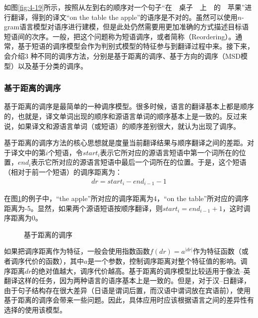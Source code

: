 \parinterval 如图\ref{fig:4-19}所示，按照从左到右的顺序对一个句子``在\ \ 桌子\ \ 上\ \ 的\ \ 苹果''进行翻译，得到的译文``on the table the apple''的语序是不对的。虽然可以使用$n$-gram语言模型对语序进行建模，但是此处仍然需要用更加准确的方式描述目标语短语间的次序。一般，把这个问题称为短语调序，或者简称{\small{}}（Reordering）。通常，基于短语的调序模型会作为判别式模型的特征参与到翻译过程中来。接下来，会介绍3 种不同的调序方法，分别是基于距离的调序、基于方向的调序（MSD模型）以及基于分类的调序。


\subsubsection{基于距离的调序}

\parinterval 基于距离的调序是最简单的一种调序模型。很多时候，语言的翻译基本上都是顺序的，也就是，译文单词出现的顺序和源语言单词的顺序基本上是一致的。反过来说，如果译文和源语言单词（或短语）的顺序差别很大，就认为出现了调序。

\parinterval 基于距离的调序方法的核心思想就是度量当前翻译结果与顺序翻译之间的差距。对于译文中的第$i$个短语，令$start_i$表示它所对应的源语言短语中第一个词所在的位置，$end_i$表示它所对应的源语言短语中最后一个词所在的位置。于是，这个短语（相对于前一个短语）的调序距离为：
\begin{eqnarray}
dr = start_i-end_{i-1}-1
\label{eq:4-15}
\end{eqnarray}

\parinterval 在图\ref{fig:4-20}的例子中，``the apple''所对应的调序距离为4，``on the table''所对应的调序距离为-5。显然，如果两个源语短语按顺序翻译，则$start_i = end_{i-1} + 1$，这时调序距离为0。

\begin{figure}[htp]
\centering

\caption{基于距离的调序}
\label{fig:4-20}
\end{figure}

\parinterval 如果把调序距离作为特征，一般会使用指数函数$f(dr) = a^{|dr|}$作为特征函数（或者调序代价的函数），其中$a$是一个参数，控制调序距离对整个特征值的影响。调序距离$dr$的绝对值越大，调序代价越高。基于距离的调序模型比较适用于像法–英翻译这样的任务，因为两种语言的语序基本上是一致的。但是，对于汉–日翻译，由于句子结构存在很大差异（日语是谓词后置，而汉语中谓词放在宾语前），使用基于距离的调序会带来一些问题。因此，具体应用时应该根据语言之间的差异性有选择的使用该模型。


